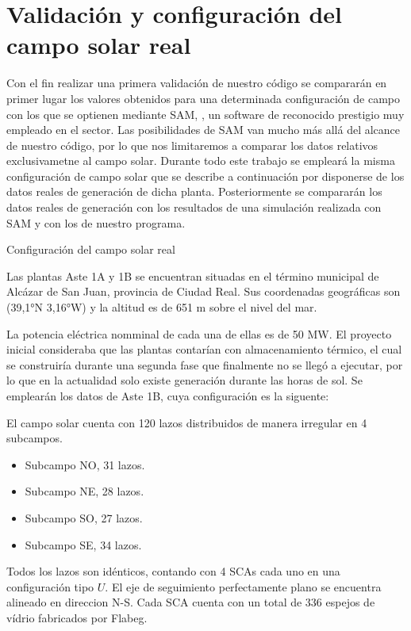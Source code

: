 \documentclass[12pt]{report} %
\begin{document}
\section{Validación y configuración del campo solar real}

Con el fin realizar una primera validación de nuestro código se compararán en primer lugar los valores obtenidos para una determinada configuración de campo con los que se optienen mediante SAM, \cite{1022085/NBJ6NM3F}, un software de reconocido prestigio muy empleado en el sector. Las posibilidades de SAM van mucho más allá del alcance de nuestro código, por lo que nos limitaremos a comparar los datos relativos exclusivametne al campo solar. Durante todo este trabajo
se empleará la misma configuración de campo solar que se describe a continuación por disponerse de los datos reales de generación de dicha planta. Posteriormente se compararán los datos reales de generación con los resultados de una simulación realizada con SAM y con los de nuestro programa.

\hypertarget{configuraciuxf3n-del-campo-solar-real}{Configuración del campo solar real}

Las plantas Aste 1A y 1B se encuentran situadas en el término municipal de Alcázar de San Juan, provincia de Ciudad Real. Sus coordenadas geográficas son (39,1°N 3,16°W) y la altitud es de 651 m sobre el nivel del mar.

La potencia eléctrica nomminal de cada una de ellas es de 50 MW. El proyecto inicial consideraba que las plantas contarían con almacenamiento térmico, el cual se construiría durante una segunda fase que finalmente no se llegó a ejecutar, por lo que en la actualidad solo existe generación durante las horas de sol. Se emplearán los datos de Aste 1B, cuya configuración es la siguente:

El campo solar cuenta con 120 lazos distribuidos de manera irregular en 4 subcampos.

\begin{itemize}
\item
  Subcampo NO, 31 lazos.
\item
  Subcampo NE, 28 lazos.
\item
  Subcampo SO, 27 lazos.
\item
  Subcampo SE, 34 lazos.
\end{itemize}

Todos los lazos son idénticos, contando con 4 SCAs cada uno en una configuración tipo \(U\). El eje de seguimiento perfectamente plano se encuentra alineado en direccion N-S. Cada SCA cuenta con un total de 336 espejos de vídrio fabricados por Flabeg.
\end{document}
